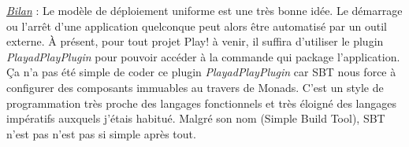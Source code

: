\bigskip
\underline{\textit{Bilan}} : Le modèle de déploiement uniforme est une très
bonne idée. Le démarrage ou l'arrêt d'une application quelconque peut alors être
 automatisé par un outil externe. 
À présent, pour tout projet Play! à venir, il suffira d'utiliser le plugin
\textit{PlayadPlayPlugin} pour pouvoir accéder à la commande qui package
l'application.
Ça n'a pas été simple de coder ce plugin \textit{PlayadPlayPlugin} car SBT nous
force à configurer des composants immuables au travers de Monads. C'est un style
de programmation très proche des langages fonctionnels et très éloigné des
langages impératifs auxquels j'étais habitué. Malgré son nom (Simple Build
Tool), SBT n'est pas n'est pas si simple après tout.


